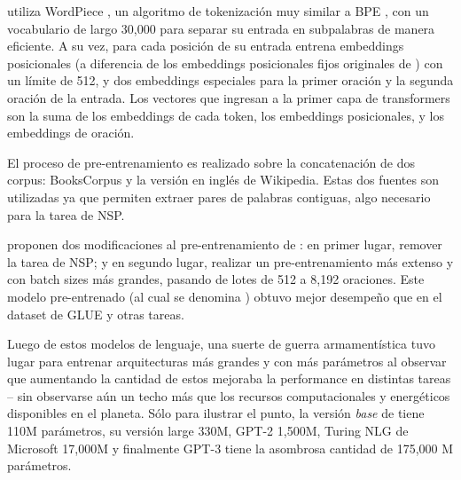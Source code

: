 \bert{} utiliza WordPiece \cite{wu2016google}, un algoritmo de tokenización muy similar a BPE \cite{sennrich2016neural}, con un vocabulario de largo 30,000 para separar su entrada en subpalabras de manera eficiente. A su vez, para cada posición de su entrada entrena embeddings posicionales (a diferencia de los embeddings posicionales fijos originales de \citet{vaswani2017attention}) con un límite de 512, y dos embeddings especiales para la primer oración y la segunda oración de la entrada. Los vectores que ingresan a la primer capa de transformers son la suma de los embeddings de cada token, los embeddings posicionales, y los embeddings de oración.

El proceso de pre-entrenamiento es realizado sobre la concatenación de dos corpus: BooksCorpus \cite{zhu2015bookscorpus} y la versión en inglés de Wikipedia. Estas dos fuentes son utilizadas ya que permiten extraer pares de palabras contiguas, algo necesario para la tarea de NSP.


\citet{liu2019roberta} proponen dos modificaciones al pre-entrenamiento de \bert{}: en primer lugar, remover la tarea de NSP; y en segundo lugar, realizar un pre-entrenamiento más extenso y con batch sizes más grandes, pasando de lotes de 512 a 8,192 oraciones. Este modelo pre-entrenado (al cual se denomina \roberta{}) obtuvo mejor desempeño que \bert{} en el dataset de GLUE y otras tareas.

Luego de estos modelos de lenguaje, una suerte de guerra armamentística tuvo lugar para entrenar arquitecturas más grandes y con más parámetros al observar que aumentando la cantidad de estos mejoraba la performance en distintas tareas -- sin observarse aún un techo más que los recursos computacionales y energéticos disponibles en el planeta. Sólo para ilustrar el punto, la versión \emph{base} de \bert{} tiene 110M parámetros, su versión large 330M, GPT-2 1,500M, Turing NLG de Microsoft 17,000M y finalmente GPT-3 \cite{brown2020language} tiene la asombrosa cantidad de 175,000 M parámetros.